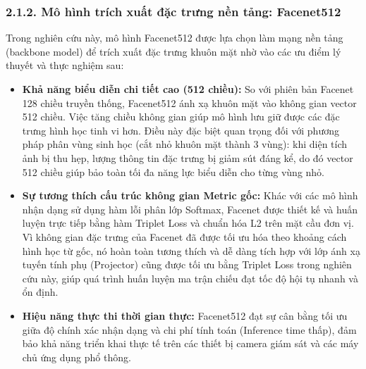 \subsubsection*{2.1.2. Mô hình trích xuất đặc trưng nền tảng: Facenet512}

Trong nghiên cứu này, mô hình Facenet512 được lựa chọn làm mạng nền tảng (backbone model) để trích xuất đặc trưng khuôn mặt nhờ vào các ưu điểm lý thuyết và thực nghiệm sau:
\begin{itemize}
    \item \textbf{Khả năng biểu diễn chi tiết cao (512 chiều):} So với phiên bản Facenet 128 chiều truyền thống, Facenet512 ánh xạ khuôn mặt vào không gian vector 512 chiều. Việc tăng chiều không gian giúp mô hình lưu giữ được các đặc trưng hình học tinh vi hơn. Điều này đặc biệt quan trọng đối với phương pháp phân vùng sinh học (cắt nhỏ khuôn mặt thành 3 vùng): khi diện tích ảnh bị thu hẹp, lượng thông tin đặc trưng bị giảm sút đáng kể, do đó vector 512 chiều giúp bảo toàn tối đa năng lực biểu diễn cho từng vùng nhỏ.
    
    \item \textbf{Sự tương thích cấu trúc không gian Metric gốc:} Khác với các mô hình nhận dạng sử dụng hàm lỗi phân lớp Softmax, Facenet được thiết kế và huấn luyện trực tiếp bằng hàm Triplet Loss và chuẩn hóa L2 trên mặt cầu đơn vị. Vì không gian đặc trưng của Facenet đã được tối ưu hóa theo khoảng cách hình học từ gốc, nó hoàn toàn tương thích và dễ dàng tích hợp với lớp ánh xạ tuyến tính phụ (Projector) cũng được tối ưu bằng Triplet Loss trong nghiên cứu này, giúp quá trình huấn luyện ma trận chiếu đạt tốc độ hội tụ nhanh và ổn định.
    
    \item \textbf{Hiệu năng thực thi thời gian thực:} Facenet512 đạt sự cân bằng tối ưu giữa độ chính xác nhận dạng và chi phí tính toán (Inference time thấp), đảm bảo khả năng triển khai thực tế trên các thiết bị camera giám sát và các máy chủ ứng dụng phổ thông.
\end{itemize}


